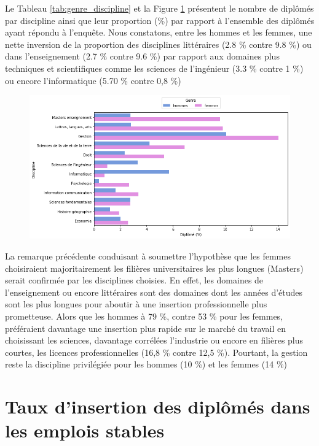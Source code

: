 \documentclass[12pt, a4paper, titlepage, table]{article}
\begin{document}
	
	Le Tableau \ref{tab:genre_discipline} et la Figure \ref{fig:genre_discipline} présentent le nombre de diplômés par discipline ainsi que leur proportion (\%) par rapport à l'ensemble des diplômés ayant répondu à l'enquête.
	Nous constatons, entre les hommes et les femmes,  une nette inversion de la proportion des disciplines  littéraires (2.8 \% contre 9.8 \%) ou dans l'enseignement (2.7 \% contre 9.6 \%) par rapport aux domaines plus techniques et scientifiques comme les sciences de l'ingénieur (3.3 \% contre 1 \%) ou encore l'informatique (5.70 \% contre 0,8 \%)

	\begin{figure}[H]
		\centering
		\includegraphics[width=1\textwidth]{../graphs/proportion_disciplines.png}
		\label{fig:genre_discipline}
	\end{figure}

	La remarque précédente conduisant à soumettre l'hypothèse que les femmes choisiraient majoritairement les filières universitaires les plus longues (Masters) serait confirmée par les disciplines choisies.
	En effet, les domaines de l'enseignement ou encore littéraires sont des domaines dont les années d'études sont les plus longues pour aboutir à une insertion professionnelle plus prometteuse.
	Alors que les hommes à 79 \%, contre  53 \% pour les femmes,  préféraient davantage une insertion plus rapide sur le marché du travail en choisissant les sciences, davantage corrélées l'industrie ou encore en filières plus courtes, les licences professionnelles (16,8 \% contre 12,5 \%). Pourtant, la gestion reste la discipline privilégiée pour les hommes (10 \%) et les femmes (14 \%) 

\section{Taux d'insertion des diplômés dans les emplois stables}
\end{document}
